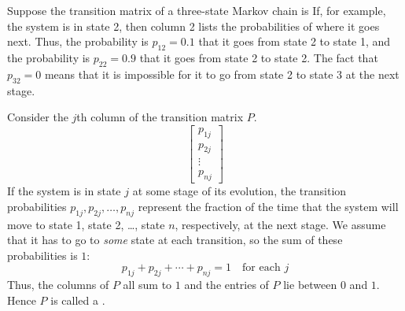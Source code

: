 \documentclass{ximera}
\begin{document}
\begin{example}\label{007243}
Suppose the transition matrix of a three-state Markov chain is
If, for example, the system is in state 2, then column 2 lists the probabilities of where it goes next. Thus, the probability is $p_{12} = 0.1$ that it goes from state 2 to state 1, and the probability is $p_{22} = 0.9$ that it goes from state 2 to state 2. The fact that $p_{32} = 0$ means that it is impossible for it to go from state 2 to state 3 at the next stage.
\end{example}

Consider the $j$th column of the transition matrix $P$.
\begin{equation*}
\begin{bmatrix}
p_{1j} \\
p_{2j} \\
\vdots \\
p_{nj}
\end{bmatrix}
\end{equation*}
If the system is in state $j$ at some stage of its evolution, the transition probabilities $p_{1j}, p_{2j}, \dots, p_{nj}$ represent the fraction of the time that the system will move to state 1, state 2, \dots, state $n$, respectively, at the next stage. We assume that it has to go to \textit{some} state at each transition, so the sum of these probabilities is $1$:
\begin{equation*}
p_{1j} + p_{2j} + \cdots + p_{nj} = 1 \quad \mbox{for each } j
\end{equation*}
Thus, the columns of $P$ all sum to $1$ and the entries of $P$ lie between $0$ and $1$. Hence $P$ is called a .
\end{document}
